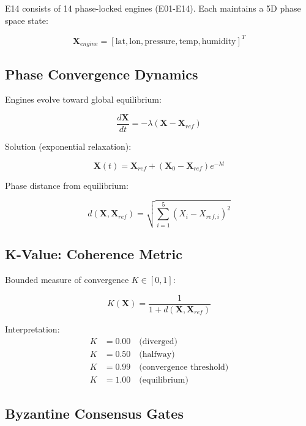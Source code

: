 \documentclass[11pt]{article}
\begin{document}
E14 consists of 14 phase-locked engines (E01-E14). Each maintains a 5D phase space state:

\begin{equation}
\mathbf{X}_{engine} = [\text{lat}, \text{lon}, \text{pressure}, \text{temp}, \text{humidity}]^T
\end{equation}

\subsection{Phase Convergence Dynamics}

Engines evolve toward global equilibrium:

\begin{equation}
\frac{d\mathbf{X}}{dt} = -\lambda(\mathbf{X} - \mathbf{X}_{ref})
\end{equation}

Solution (exponential relaxation):

\begin{equation}
\mathbf{X}(t) = \mathbf{X}_{ref} + (\mathbf{X}_0 - \mathbf{X}_{ref}) e^{-\lambda t}
\end{equation}

Phase distance from equilibrium:

\begin{equation}
d(\mathbf{X}, \mathbf{X}_{ref}) = \sqrt{\sum_{i=1}^{5}(X_i - X_{ref,i})^2}
\end{equation}

\subsection{K-Value: Coherence Metric}

Bounded measure of convergence $K \in [0,1]$:

\begin{equation}
K(\mathbf{X}) = \frac{1}{1 + d(\mathbf{X}, \mathbf{X}_{ref})}
\end{equation}

Interpretation:
\begin{align}
K &= 0.00 \quad \text{(diverged)} \\
K &= 0.50 \quad \text{(halfway)} \\
K &= 0.99 \quad \text{(convergence threshold)} \\
K &= 1.00 \quad \text{(equilibrium)}
\end{align}

\subsection{Byzantine Consensus Gates}
\end{document}
